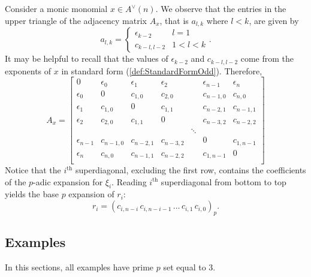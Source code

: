 \documentclass{amsart}
\theoremstyle{definition}
\theoremstyle{plain}
\numberwithin{theorem}{section}
\numberwithin{equation}{section}
\numberwithin{figure}{section}
\newcommand{\0}{\langle 0 \rangle }
\begin{document}
Consider a monic monomial $x \in A^\vee(n)$. We observe that the entries in the upper triangle of the adjacency matrix $A_{x}$, that is $a_{l,k}$ where $l<k$, are given by
\begin{equation} \label{eq:acOddRel}
a_{l,k}=
\begin{cases}
    \epsilon_{k-2} & l=1 \\
    c_{k-l,l-2} & 1<l<k
\end{cases}.
\end{equation}
It may be helpful to recall that the values of $\epsilon_{k - 2}$ and $c_{k - l, l - 2}$ come from the exponents of $x$ in standard form (\cref{def:StandardFormOdd}). Therefore,
\begin{equation} \label{eq:AdjMatrixOdd}
    A_{x}=\begin{bmatrix}
    0 & \epsilon_0 & \epsilon_1 & \epsilon_2 & & \epsilon_{n-1} & \epsilon_n \\
    \epsilon_0 & 0 & c_{1,0} & c_{2,0} & & c_{n-1,0} & c_{n,0} \\
    \epsilon_1 & c_{1,0} & 0 & c_{1,1} & & c_{n-2,1} & c_{n-1,1} \\
    \epsilon_2 & c_{2,0} & c_{1,1} & 0 & & c_{n-3,2} & c_{n-2,2} \\
     &  &  &  & \ddots & \\
    \epsilon_{n-1} & c_{n-1,0} & c_{n-2,1} & c_{n-3,2} & & 0 & c_{1,n-1} \\
    \epsilon_n & c_{n,0} & c_{n-1,1} & c_{n-2,2} & & c_{1,n-1} & 0 \\
\end{bmatrix}
\end{equation}
Notice that the $i^{\text{th}}$ superdiagonal, excluding the first row, contains the coefficients of the $p$-adic expansion for $\xi_i$. Reading $i^{\text{th}}$ superdiagonal from bottom to top yields the base $p$ expansion of $r_i$:
$$r_i={\left(c_{i,n-i} \, c_{i,n-i-1} \, \dots \, c_{i,1} \, c_{i,0} \right)_p}.$$


\subsection{Examples} In this sections, all examples have prime $p$ set equal to $3$.
\end{document}
